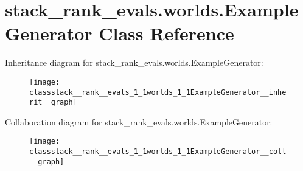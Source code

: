 \hypertarget{classstack__rank__evals_1_1worlds_1_1ExampleGenerator}{}\section{stack\+\_\+rank\+\_\+evals.\+worlds.\+Example\+Generator Class Reference}
\label{classstack__rank__evals_1_1worlds_1_1ExampleGenerator}


Inheritance diagram for stack\+\_\+rank\+\_\+evals.\+worlds.\+Example\+Generator\+:
\nopagebreak
\begin{figure}[H]
\begin{center}
\leavevmode
\texttt{[image: classstack\_\_rank\_\_evals\_1\_1worlds\_1\_1ExampleGenerator\_\_inherit\_\_graph]}
\end{center}
\end{figure}


Collaboration diagram for stack\+\_\+rank\+\_\+evals.\+worlds.\+Example\+Generator\+:
\nopagebreak
\begin{figure}[H]
\begin{center}
\leavevmode
\texttt{[image: classstack\_\_rank\_\_evals\_1\_1worlds\_1\_1ExampleGenerator\_\_coll\_\_graph]}
\end{center}
\end{figure}
